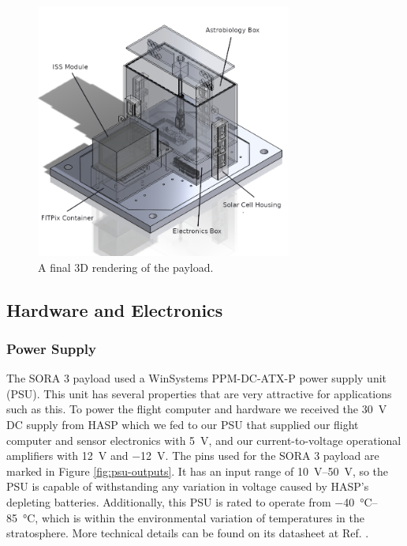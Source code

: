 \begin{figure}[h!]
	\begin{center}
		\includegraphics[width=0.75\textwidth]{figures/payload-transparent-labelled.png}
		\caption{A final 3D rendering of the payload.}
		\label{fig:payload-rendering}
	\end{center}
\end{figure}

\subsection{Hardware and Electronics}
\subsubsection{Power Supply}

The SORA 3 payload used a WinSystems PPM-DC-ATX-P power supply unit (PSU).
This unit has several properties that are very attractive for applications such as this. 
To power the flight computer and hardware we received the \SI{30}{\volt} DC supply from HASP which we fed to our PSU that supplied our flight computer and sensor electronics with \SI{+5}{\volt}, and our current-to-voltage operational amplifiers with \SI{+12}{\volt} and \SI{-12}{\volt}.
The pins used for the SORA 3 payload are marked in Figure \ref{fig:psu-outputs}.
It has an input range of \SIrange{10}{50}{\volt}, so the PSU is capable of withstanding any variation in voltage caused by HASP's depleting batteries.
Additionally, this PSU is rated to operate from \SIrange{-40}{85}{\celsius}, which is within the environmental variation of temperatures in the stratosphere.
More technical details can be found on its datasheet at Ref. \cite{WinSystems-PSU}.

